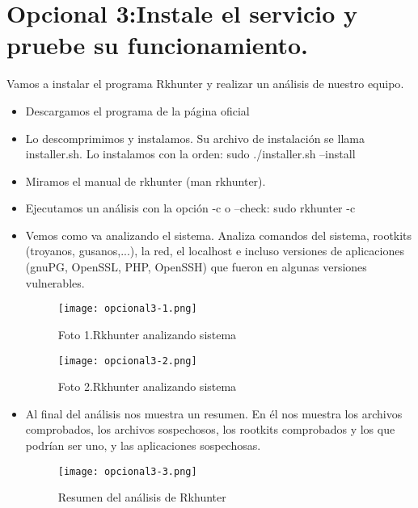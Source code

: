 	
	
	\section{Opcional 3:Instale el servicio y pruebe su funcionamiento.}
	
	
	Vamos a instalar el programa Rkhunter y realizar un análisis de nuestro equipo\cite{opcional3-1}.
	
	\begin{itemize}
		\item Descargamos el programa de la página oficial\cite{opcional3-2}
		\item Lo descomprimimos y instalamos. Su archivo de instalación se llama installer.sh. Lo instalamos con la orden: sudo ./installer.sh --install
		\item Miramos el manual de rkhunter (man rkhunter).
		\item Ejecutamos un análisis con la opción -c o --check: sudo rkhunter -c
		\item Vemos como va analizando el sistema. Analiza comandos del sistema, rootkits (troyanos, gusanos,...), la red, el localhost e incluso versiones de aplicaciones (gnuPG, OpenSSL, PHP, OpenSSH) que fueron en algunas versiones vulnerables.
		\begin{figure}[H]	
			\centering
			\texttt{[image: opcional3-1.png]} 
			\label{figura123} 
			\caption{Foto 1.Rkhunter analizando sistema}
		\end{figure} 
		\begin{figure}[H]	
			\centering
			\texttt{[image: opcional3-2.png]} 
			\label{figura124} 
			\caption{Foto 2.Rkhunter analizando sistema}
		\end{figure}
		\item Al final del análisis nos muestra un resumen. En él nos muestra los archivos comprobados, los archivos sospechosos, los rootkits comprobados y los que podrían ser uno, y las aplicaciones sospechosas.
		\begin{figure}[H]	
			\centering
			\texttt{[image: opcional3-3.png]} 
			\label{figura125} 
			\caption{Resumen del análisis de Rkhunter}
		\end{figure}
	\end{itemize}
	

